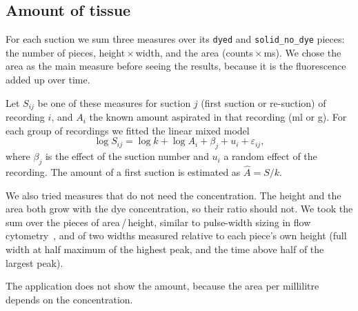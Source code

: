 \subsection{Amount of tissue}
\label{sec:amount-methods}
For each suction we sum three measures over its \texttt{dyed} and \texttt{solid\_no\_dye}
pieces: the number of pieces, height\,$\times$\,width, and the area (counts\,$\times$\,ms).
We chose the area as the main measure before seeing the results, because it is the fluorescence
added up over time.

Let $S_{ij}$ be one of these measures for suction $j$ (first suction or re-suction) of
recording $i$, and $A_i$ the known amount aspirated in that recording (ml or g). For each group of
recordings we fitted the linear mixed model
\begin{equation}
  \log S_{ij} = \log k + \log A_i + \beta_j + u_i + \varepsilon_{ij},
  \label{eq:amount}
\end{equation}
where $\beta_j$ is the effect of the suction number and $u_i$ a random effect of the recording.
The amount of a first
suction is estimated as $\hat{A} = S / k$.

We also tried measures that do not need the concentration. The height and the area both grow with the dye
concentration, so their ratio should not. We took the sum over the pieces of area\,/\,height,
similar to pulse-width sizing in flow cytometry~\cite{sharpless1976}, and of two widths measured
relative to each piece's own height (full width at half maximum of the highest peak, and the
time above half of the largest peak).

The application does not show the amount, because the area per millilitre depends on the
concentration.
